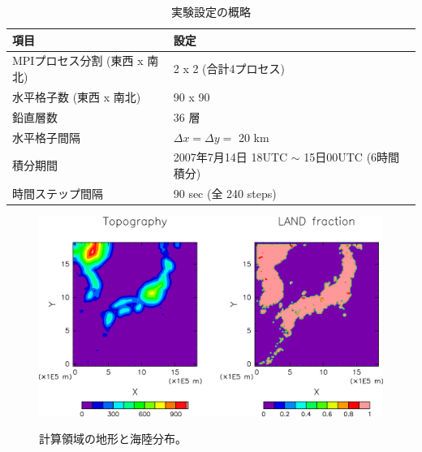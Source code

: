 \begin{table}[h]
\begin{center}
  \caption{実験設定の概略}
  \label{tab:grids}
  \begin{tabularx}{150mm}{|l|X|} \hline
    \rowcolor[gray]{0.9} 項目 & 設定 \\ \hline
    MPIプロセス分割 (東西 x 南北) & 2 x 2 (合計4プロセス) \\ \hline
    水平格子数 (東西 x 南北) & 90 x 90 \\ \hline
    鉛直層数                 & 36 層                  \\ \hline
    水平格子間隔             & $\Delta x = \Delta y =$ 20 km       \\ \hline
    積分期間 & 2007年7月14日 18UTC $\sim$ 15日00UTC (6時間積分) \\ \hline
    時間ステップ間隔 & 90 sec (全 240 steps) \\ \hline
  \end{tabularx}
\end{center}
\end{table}

\begin{figure}[tb]
\begin{center}
  \includegraphics[width=1.0\hsize]{./figure/real_domain.eps}\\
  \caption{計算領域の地形と海陸分布。}
  \label{fig:tutrial_real_domain}
\end{center}
\end{figure}

